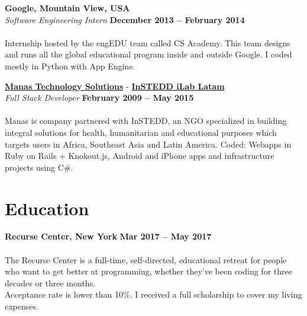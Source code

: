 \documentclass[margin,line]{resume}
\begin{document}
\begin{resume}
\begin{itemize}
\end{itemize}





\newpage



\textbf{Google, Mountain View, USA}\vspace{2mm}\\\vspace{1mm}
\textsl{Software Engineering Intern} \hfill \textbf{December 2013 -- February 2014}\vspace{-3mm}\\\vspace{-1mm}
\\
Internship hosted by the engEDU team called CS Academy. This team designs and runs all the global educational program inside and outside Google. I coded mostly in Python with App Engine.

\textbf{\href{http://www.manas.com.ar/}{Manas Technology Solutions}} - 
\textbf{\href{http://www.instedd.org/}{InSTEDD iLab Latam}}\vspace{2mm}\\\vspace{1mm}
\textsl{Full Stack Developer} \hfill \textbf{February 2009 -- May 2015}\vspace{-3mm}\\\vspace{-1mm}
\\
Manas is company partnered with InSTEDD, an NGO specialized in building integral solutions for health, humanitarian and educational purposes which targets users in Africa, Southeast Asia and Latin America.  
Coded: Webapps in Ruby on Rails + Knokout.js, Android and iPhone  apps and infrastructure projects using C\#.



\section{\mysidestyle Education}



\textbf{Recurse Center, New York} \hfill \textbf{Mar 2017 -- May 2017}\vspace{-3mm}\\\vspace{-1mm}
\\
The Recurse Center is a full-time, self-directed, educational retreat for people who want to get better at programming, whether they've been coding for three decades or three months.  \\
Acceptance rate is lower than 10\%. I received a full scholarship to cover my living expenses.



\end{resume}
\end{document}
